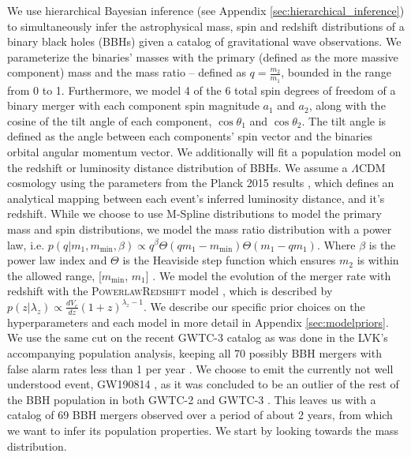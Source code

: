 We use hierarchical Bayesian inference (see Appendix \ref{sec:hierarchical_inference}) to simultaneously infer the astrophysical mass, spin and redshift distributions of 
a binary black holes (BBHs) given a catalog of gravitational wave observations. We parameterize the binaries' masses with the primary (defined as the more massive component) mass 
and the mass ratio -- defined as $q=\frac{m_2}{m_1}$, bounded in the range from 0 to 1. Furthermore, we model 4 of the 6 total 
spin degrees of freedom of a binary merger with each component spin magnitude $a_1$ and $a_2$, along with the cosine of the tilt angle of each component, 
$\cos{\theta_1}$ and $\cos{\theta_2}$. The tilt angle is defined as the angle between each components' spin vector and the binaries orbital angular momentum vector. 
We additionally will fit a population model on the redshift or luminosity distance distribution of BBHs. We assume a $\Lambda\mathrm{CDM}$ cosmology using the 
parameters from the Planck 2015 results \cite{Planck2015}, which defines an analytical mapping between each event's inferred
luminosity distance, and it's redshift. While we choose to use M-Spline distributions to model the primary mass and spin distributions, we 
model the mass ratio distribution with a power law, i.e. $p(q | m_1, m_\mathrm{min}, \beta) \propto q^{\beta} \Theta(qm_1 - m_\mathrm{min}) \Theta(m_1 - qm_1)$. 
Where $\beta$ is the power law index and $\Theta$ is the Heaviside step function which ensures $m_2$ is within the allowed range, [$m_\mathrm{min}$, $m_1$] \cite{Talbot_2018,o1o2_pop,o3a_pop}.
We model the evolution of the merger rate with redshift with the \textsc{PowerlawRedshift} model \cite{Fishbach_2018redshift}, which is described by 
$p(z|\lambda_z)\propto \frac{dV_c}{dz}(1+z)^{\lambda_z-1}$. We describe our specific prior choices on the hyperparameters and each model 
in more detail in Appendix \ref{sec:modelpriors}. We use the same cut on the recent GWTC-3 catalog as was done in the LVK's accompanying population analysis, 
keeping all 70 possibly BBH mergers with false alarm rates less than 1 per year \cite{GWTC3,o3b_astro_dist}. We choose to emit the currently not well understood event, 
GW190814 \cite{190814disc}, as it was concluded to be an outlier of the rest of the BBH population in both GWTC-2 and GWTC-3 \cite{o3a_pop,o3b_astro_dist,Essick_2022}. 
This leaves us with a catalog of 69 BBH mergers observed over a period of about 2 years, from which we want to infer its population properties. 
We start by looking towards the mass distribution.

